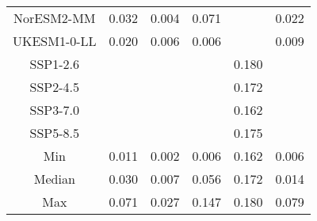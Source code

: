 \begin{table*}[t]
\begin{tabular}{c|rrr|rr}
NorESM2-MM & 0.032 & 0.004 & 0.071 &  & 0.022 \\
UKESM1-0-LL & 0.020 & 0.006 & 0.006 &  & 0.009 \\
SSP1-2.6 &  &  &  & 0.180 &  \\
SSP2-4.5 &  &  &  & 0.172 &  \\
SSP3-7.0 &  &  &  & 0.162 &  \\
SSP5-8.5 &  &  &  & 0.175 &  \\
\midrule
Min & 0.011 & 0.002 & 0.006 & 0.162 & 0.006 \\
Median & 0.030 & 0.007 & 0.056 & 0.172 & 0.014 \\
Max & 0.071 & 0.027 & 0.147 & 0.180 & 0.079 \\
\bottomrule
\end{tabular}
\end{table*}
